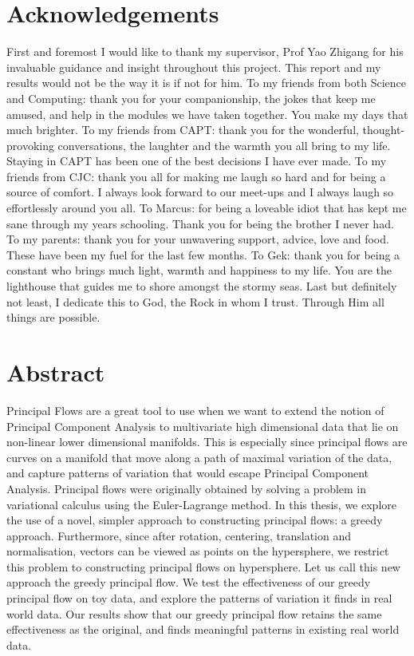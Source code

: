 \documentclass[12pt]{report}
\begin{document}
\chapter*{Acknowledgements}
First and foremost I would like to thank my supervisor, Prof Yao Zhigang
for his invaluable guidance and insight throughout this project. This report
and my results would not be the way it is if not for him. To my friends
from both Science and Computing: thank you for your companionship, 
the jokes that keep me amused, and help in the 
modules we have taken together. You make my days that much brighter. 
To my friends from CAPT: thank you for the wonderful, thought-provoking conversations,
the laughter and the warmth you all bring to my life. 
Staying in CAPT has been one of the best decisions I have ever made.
To my friends from CJC: thank you all for making me laugh so hard and for being 
a source of comfort. I always look forward to our meet-ups and I always laugh so 
effortlessly around you all.
To Marcus: for being a loveable idiot that has kept me sane through my years schooling. 
Thank you for being the brother I never had.
To my parents: thank you for your unwavering support, advice, love and food.
These have been my fuel for the last few months. 
To Gek: thank you for being a constant who brings much light, warmth and 
happiness to my life. You are the 
lighthouse that guides me to shore amongst the stormy seas. 
Last but definitely not least, I dedicate this to God, the Rock in whom I trust. 
Through Him all things are possible.


\chapter*{Abstract}

Principal Flows are a great tool to use when we want to extend the 
notion of Principal Component Analysis to multivariate high dimensional data that 
lie on non-linear lower dimensional manifolds.
This is especially since principal flows are curves on a manifold 
that move along a path of maximal variation of the data, and capture patterns of
variation that would escape Principal Component Analysis.
Principal flows were originally obtained by solving a problem
in variational calculus using the Euler-Lagrange method. 
In this thesis, we explore the use of a novel, simpler approach to constructing 
principal flows: a greedy approach.
Furthermore, since after rotation, centering, translation 
and normalisation, vectors can be viewed as points on the hypersphere, 
we restrict this problem to constructing principal flows on hypersphere.
Let us call this new approach the greedy principal flow.
We test the effectiveness of our greedy principal flow on toy data, and
explore the patterns of variation it finds in real world data. Our results show that
our greedy principal flow retains the same effectiveness as the original, and
finds meaningful patterns in existing real world data.
\end{document}
